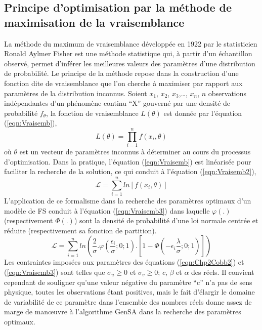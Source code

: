 \subsection{Principe d'optimisation par la méthode de maximisation de la vraisemblance}
La méthode du maximum de vraisemblance développée en 1922 \cite{Stigler@2007, Aldrich@1997} par le statisticien Ronald Aylmer Fisher est une méthode statistique qui, à partir d’un échantillon observé, permet d’inférer les meilleures valeurs des paramètres d'une distribution de probabilité. Le principe de la méthode repose dans la construction d’une fonction dite de vraisemblance que l’on cherche à maximiser par rapport aux paramètres de la distribution inconnus. Soient $x_{1}$, $x_{2}$, $x_{3}$,…, $x_{n}$, $n$ observations indépendantes d’un phénomène continu \enquote{X} gouverné par une densité de probabilité $f_{\theta}$, la fonction de vraisemblance  $L(\theta)$ est donnée par l’équation (\ref{eqn:Vraisemb}),
%
\begin{equation}\label{eqn:Vraisemb}
	L (\theta) =\prod^{n}_{i=1}f\left(x_{i}, \theta\right)
\end{equation}
%
où $\theta$ est un vecteur de paramètres inconnus à déterminer au cours du processus d’optimisation. Dans la pratique, l'équation (\ref{eqn:Vraisemb}) est linéarisée pour faciliter la recherche de la solution, ce qui conduit à l'équation (\ref{eqn:Vraisemb2}),
%
\begin{equation}\label{eqn:Vraisemb2}
\mathcal{L} = \sum^{n}_{i=1}ln\left[f\left(x_{i}, \theta\right)\right]
\end{equation}
%
L'application de ce formalisme dans la recherche des paramètres optimaux d'un modèle de FS conduit à l'équation (\ref{eqn:Vraisemb3}) dans laquelle $\varphi (.)$ (respectivement $\Phi (.)$) sont la densité de probabilité d'une loi normale centrée et réduite (respectivement sa fonction de partition).
%
\begin{equation}\label{eqn:Vraisemb3}
\mathcal{L} = \sum^{n}_{i=1}ln\left(\frac{2}{\sigma}.\varphi\left(\frac{\epsilon_{i}}{\sigma}; 0; 1\right).\left[1-\Phi\left(-\epsilon_{i}\frac{\lambda}{\sigma};0;1\right)\right]\right)
\end{equation}
%
Les contraintes imposées aux paramètres des équations (\ref{eqn:Chp2Cobb2}) et (\ref{eqn:Vraisemb3}) sont telles que $\sigma_{u} ≥ 0$ et $\sigma_{v} ≥ 0$; $c$, $\beta$ et $\alpha$ des réels. Il convient cependant de souligner qu'une valeur négative du paramètre \enquote{c} n'a pas de sens physique, toutes les observations étant positives, mais le fait d'élargir le domaine de variabilité de ce paramètre dans l'ensemble des nombres réels donne assez de marge de manœuvre à l'algorithme GenSA dans la recherche des paramètres optimaux.
%
